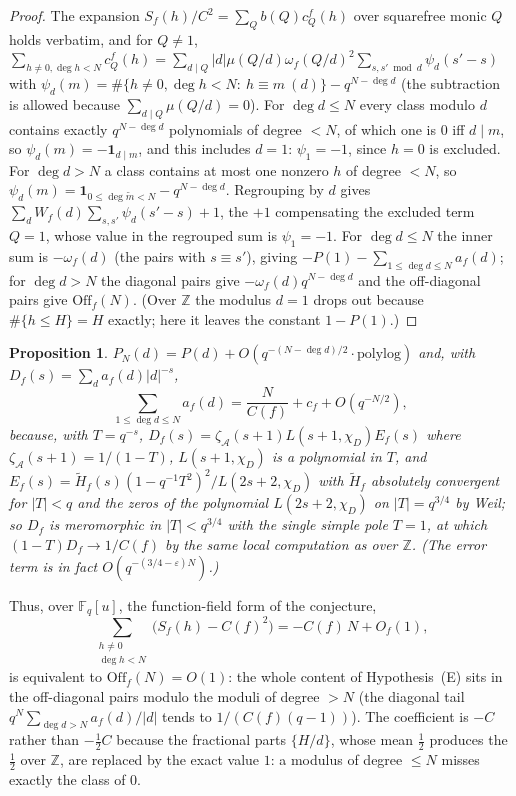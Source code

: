 \documentclass[11pt,a4paper]{article}
\newtheorem{proposition}[theorem]{Proposition}
\newcommand{\Z}{\mathbb{Z}}
\newcommand{\F}{\mathbb{F}}
\newcommand{\A}{\mathcal A}
\begin{document}
\begin{proof}
The expansion $S_f(h)/C^2=\sum_Qb(Q)c^f_Q(h)$ over squarefree monic $Q$ holds verbatim, and for $Q\ne1$,
$\sum_{h\ne0,\deg h<N}c^f_Q(h)=\sum_{d\mid Q}|d|\mu(Q/d)\omega_f(Q/d)^2\sum_{s,s'\bmod d}\psi_d(s'-s)$ with
$\psi_d(m)=\#\{h\ne0,\deg h<N:\ h\equiv m\ (d)\}-q^{N-\deg d}$ (the subtraction is allowed because
$\sum_{d\mid Q}\mu(Q/d)=0$). For $\deg d\le N$ every class modulo $d$ contains exactly $q^{N-\deg d}$
polynomials of degree $<N$, of which one is $0$ iff $d\mid m$, so $\psi_d(m)=-\mathbf 1_{d\mid m}$, and this
includes $d=1$: $\psi_1=-1$, since $h=0$ is excluded. For $\deg d>N$ a class contains at most one nonzero
$h$ of degree $<N$, so $\psi_d(m)=\mathbf 1_{0\le\deg\tilde m<N}-q^{N-\deg d}$. Regrouping by $d$ gives
$\sum_dW_f(d)\sum_{s,s'}\psi_d(s'-s)+1$, the $+1$ compensating the excluded term $Q=1$, whose value in the
regrouped sum is $\psi_1=-1$. For $\deg d\le N$ the inner sum is $-\omega_f(d)$ (the pairs with
$s\equiv s'$), giving $-P(1)-\sum_{1\le\deg d\le N}a_f(d)$; for $\deg d>N$ the diagonal pairs give
$-\omega_f(d)q^{N-\deg d}$ and the off-diagonal pairs give $\mathrm{Off}_f(N)$. (Over $\Z$ the modulus
$d=1$ drops out because $\#\{h\le H\}=H$ exactly; here it leaves the constant $1-P(1)$.)
\end{proof}

\begin{proposition}\label{prop:B2}
$P_N(d)=P(d)+O(q^{-(N-\deg d)/2}\cdot\text{polylog})$ and, with $D_f(s)=\sum_da_f(d)|d|^{-s}$,
\[
\sum_{1\le\deg d\le N}a_f(d)=\frac N{C(f)}+c_f+O(q^{-N/2}),
\]
because, with $T=q^{-s}$, $D_f(s)=\zeta_\A(s+1)L(s+1,\chi_D)E_f(s)$ where $\zeta_\A(s+1)=1/(1-T)$,
$L(s+1,\chi_D)$ is a polynomial in $T$, and $E_f(s)=\tilde H_f(s)(1-q^{-1}T^2)^2/L(2s+2,\chi_D)$ with
$\tilde H_f$ absolutely convergent for $|T|<q$ and the zeros of the polynomial $L(2s+2,\chi_D)$ on
$|T|=q^{3/4}$ by Weil; so $D_f$ is meromorphic in $|T|<q^{3/4}$ with the single simple pole $T=1$, at which
$(1-T)D_f\to1/C(f)$ by the same local computation as over $\Z$. (The error term is in fact
$O(q^{-(3/4-\varepsilon)N})$.)
\end{proposition}

Thus, over $\F_q[u]$, the function-field form of the conjecture,
\begin{equation}\label{eq:ffconj}
\sum_{\substack{h\ne0\\\deg h<N}}\bigl(S_f(h)-C(f)^2\bigr)=-C(f)\,N+O_f(1),
\end{equation}
is equivalent to $\mathrm{Off}_f(N)=O(1)$: the whole content of Hypothesis~(E) sits in the off-diagonal
pairs modulo the moduli of degree $>N$ (the diagonal tail $q^N\sum_{\deg d>N}a_f(d)/|d|$ tends to
$1/(C(f)(q-1))$). The coefficient is $-C$ rather than $-\tfrac12C$ because the fractional parts $\{H/d\}$,
whose mean $\tfrac12$ produces the $\tfrac12$ over $\Z$, are replaced by the exact value $1$: a modulus of
degree $\le N$ misses exactly the class of $0$.
\end{document}
